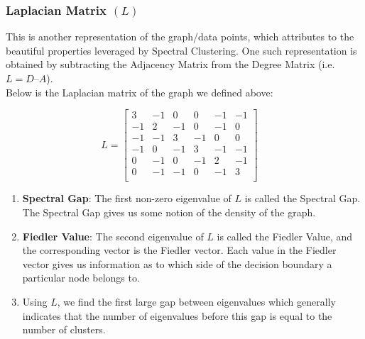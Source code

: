 \documentclass{article}
\begin{document}
        \subsubsection{Laplacian Matrix $(L)$}
        This is another representation of the graph/data points, which attributes to the beautiful properties leveraged by Spectral Clustering. One such representation is obtained by subtracting the Adjacency Matrix from the Degree Matrix (i.e. $L = D – A$).
        \\
        
        \noindent Below is the Laplacian matrix of the graph we defined above:
        
        $$ L = 
    	\begin{bmatrix} 
    	3 & -1 & 0 & 0 & -1 & -1 \\
    	-1 & 2 & -1 & 0 & -1 & 0 \\
    	-1 & -1 & 3 & -1 & 0 & 0 \\
     	-1 & 0 & -1 & 3 & -1 & -1 \\
      	0 & -1 & 0 & -1 & 2 & -1 \\
       	0 & -1 & -1 & 0 & -1 & 3 \\
    	\end{bmatrix}
    	\quad
        $$
        \begin{enumerate}
            \item \textbf{Spectral Gap}: The first non-zero eigenvalue of $L$ is called the Spectral Gap. The Spectral Gap gives us some notion of the density of the graph.
            \item \textbf{Fiedler Value}: The second eigenvalue of $L$ is called the Fiedler Value, and the corresponding vector is the Fiedler vector. Each value in the Fiedler vector gives us information as to which side of the decision boundary a particular node belongs to.
            \item Using $L$, we find the first large gap between eigenvalues which generally indicates that the number of eigenvalues before this gap is equal to the number of clusters.
        \end{enumerate}
    
\end{document}
